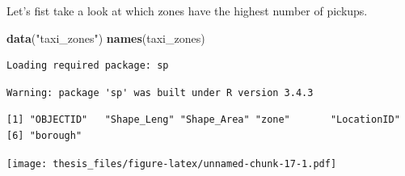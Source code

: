 \documentclass[12pt,twoside]{reedthesis}
\newenvironment{Shaded}{\begin{snugshade}}{\end{snugshade}}
\newcommand{\KeywordTok}[1]{\textcolor[rgb]{0.13,0.29,0.53}{\textbf{#1}}}
\newcommand{\DataTypeTok}[1]{\textcolor[rgb]{0.13,0.29,0.53}{#1}}
\newcommand{\DecValTok}[1]{\textcolor[rgb]{0.00,0.00,0.81}{#1}}
\newcommand{\StringTok}[1]{\textcolor[rgb]{0.31,0.60,0.02}{#1}}
\newcommand{\CommentTok}[1]{\textcolor[rgb]{0.56,0.35,0.01}{\textit{#1}}}
\newcommand{\OtherTok}[1]{\textcolor[rgb]{0.56,0.35,0.01}{#1}}
\newcommand{\OperatorTok}[1]{\textcolor[rgb]{0.81,0.36,0.00}{\textbf{#1}}}
\newcommand{\NormalTok}[1]{#1}
\theoremstyle{definition}
\theoremstyle{definition}
\theoremstyle{definition}
\theoremstyle{remark}
\begin{document}
Let's fist take a look at which zones have the highest number of
pickups.
\begin{Shaded}
\begin{Highlighting}[]
\KeywordTok{data}\NormalTok{(}\StringTok{"taxi_zones"}\NormalTok{)}
\KeywordTok{names}\NormalTok{(taxi_zones)}
\end{Highlighting}
\end{Shaded}
\begin{verbatim}
Loading required package: sp
\end{verbatim}
\begin{verbatim}
Warning: package 'sp' was built under R version 3.4.3
\end{verbatim}
\begin{verbatim}
[1] "OBJECTID"   "Shape_Leng" "Shape_Area" "zone"       "LocationID"
[6] "borough"   
\end{verbatim}
\begin{Shaded}
\end{Shaded}
\texttt{[image: thesis\_files/figure-latex/unnamed-chunk-17-1.pdf]}
\end{document}
